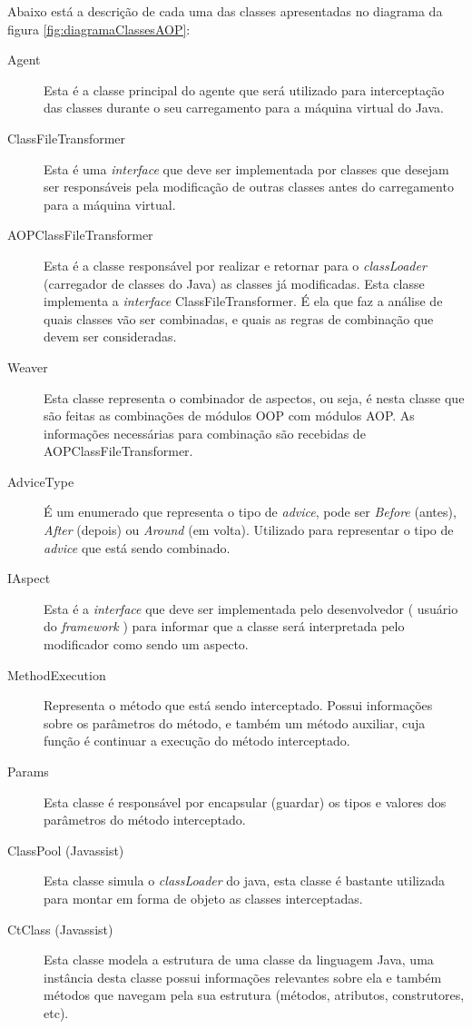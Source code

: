 \documentclass[tc,openright]{iiufrgs}
\begin{document}
Abaixo está a descrição de cada uma das classes apresentadas no diagrama da figura \ref{fig:diagramaClassesAOP}:

\begin{description}
\item [Agent] Esta é a classe principal do agente que será utilizado para interceptação das classes durante o seu carregamento para a máquina virtual do Java.
\item [ClassFileTransformer] Esta é uma \textit{interface} que deve ser implementada por classes que desejam ser responsáveis pela modificação de outras classes antes do carregamento para a máquina virtual.
\item [AOPClassFileTransformer] Esta é a classe responsável por realizar e retornar para o \textit{classLoader} (carregador de classes do Java) as classes já modificadas. Esta classe implementa a \textit{interface} ClassFileTransformer. É ela que faz a análise de quais classes vão ser combinadas, e quais as regras de combinação que devem ser consideradas. 
\item [Weaver] Esta classe representa o combinador de aspectos, ou seja, é nesta classe que são feitas as combinações de módulos OOP com módulos AOP. As informações necessárias para combinação são recebidas de AOPClassFileTransformer.
\item [AdviceType] É um enumerado que representa o tipo de \textit{advice}, pode ser \textit{Before} (antes), \textit{After} (depois) ou \textit{Around} (em volta). Utilizado para representar o tipo de \textit{advice} que está sendo combinado.
\item [IAspect] Esta é a \textit{interface} que deve ser implementada pelo desenvolvedor ( usuário do \textit{framework} ) para informar que a classe será interpretada pelo modificador como sendo um aspecto.
\item [MethodExecution] Representa o método que está sendo interceptado. Possui informações sobre os parâmetros do método, e também um método auxiliar, cuja função é continuar a execução do método interceptado.
\item [Params]  Esta classe é responsável por encapsular (guardar) os tipos e valores dos parâmetros do método interceptado.
\item [ClassPool (Javassist)] Esta classe simula o \textit{classLoader} do java, esta classe é bastante utilizada para montar em forma de objeto as classes interceptadas.
\item [CtClass (Javassist)] Esta classe modela a estrutura de uma classe da linguagem Java, uma instância desta classe possui informações relevantes sobre ela e também métodos que navegam pela sua estrutura (métodos, atributos, construtores, etc). 

\end{description}
\end{document}

